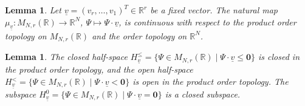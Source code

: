 \documentclass[12pt, a4article]{amsart}   	%
\numberwithin{equation}{section}
\theoremstyle{plain}
\newtheorem{lemma}[theorem]{Lemma}
\theoremstyle{definition}
\newcommand{\uv}{{\underline v}}
\begin{document}
\begin{lemma}\label{lem:continuous}
Let $\uv=(v_r,\ldots,v_1)^T\in\mathbb R^r$ be a fixed vector. The natural map $\mu_\uv:M_{N,r}(\mathbb R)\rightarrow \mathbb{R}^N$, $\Psi\mapsto \Psi\cdot\uv$, is continuous with respect to the product order topology on $M_{N,r}(\mathbb R)$ and the order topology on $\mathbb R^N$.
\end{lemma}

\begin{lemma}\label{lemma:cone:closed:open}
The closed half-space 
$H_{{\uv}}^\leq =\{\Psi\in M_{N,r}(\mathbb R)\mid \Psi\cdot\uv\le \mathbf 0\}$ is closed in the product order topology, and the open half-space $H_{ {\uv}}^< =\{\Psi\in M_{N,r}(\mathbb R)\mid \Psi\cdot\uv < \mathbf 0\}$ is open in the product order topology. The subspace $H_{ {\uv}}^0 =\{\Psi\in M_{N,r}(\mathbb R)\mid \Psi\cdot\uv = \mathbf 0\}$ is a closed subspace.
 \end{lemma}
 
\end{document}
